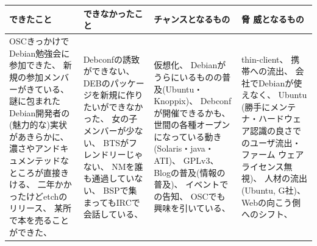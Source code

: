 \documentclass[cjk,dvipdfmx,12pt]{beamer}
\begin{document}
\section{}
\begin{frame}{}

{\scriptsize
\begin{tabular}[t]{|p{8em}|p{8em}|p{8em}|p{8em}|}
\hline
できたこと & できなかったこと & チャンスとなるもの & 脅
 威となるもの \\
\hline
OSCきっかけでDebian勉強会に参加できた、
新規の参加メンバーがきている、
謎に包まれたDebian開発者の(魅力的な)実状があきらかに、
濃さやアンドキュメンテッドなところが直接きける、
二年かかったけどetchのリリース、
某所で本を売ることができた、
&

Debconfの誘致ができない、
DEBのパッケージを新規に作りたいができなかった、
女の子メンバーが少ない、
BTSがフレンドリーじゃない、
NMを誰も通過していない、
BSPで集まってもIRCで会話している、

&
仮想化、
Debianがうらにいるものの普及(Ubuntu・Knoppix)、
Debconfが開催できるかも、
世間の各種オープンになっている動き(Solaris・java・ATI)、
GPLv3、
Blogの普及(情報の普及)、
イベントでの告知、
OSCでも興味を引いている、
&
thin-client、
携帯への流出、
会社でDebianが使えなく、
Ubuntu (勝手にメンテナ・ハードウェア認識の良さでのユーザ流出・ファーム
	     ウェアライセンス無視)、
人材の流出(Ubuntu, G社)、
Webの向こう側へのシフト、

\\
\hline
\end{tabular}
}
\end{frame}
\end{document}
